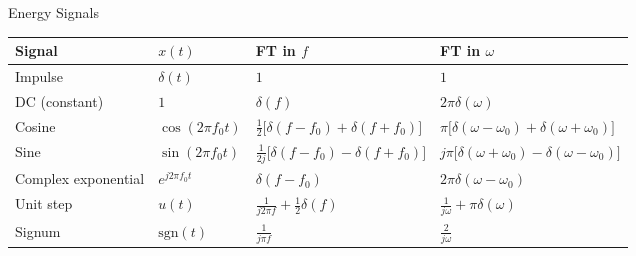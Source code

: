\documentclass[a4paper,10.5pt]{article}
\begin{document}
Energy Signals

\begin{center}
\renewcommand{\arraystretch}{1.5}
\begin{tabular}{|>{\centering\arraybackslash}m{3cm}|
                >{\centering\arraybackslash}m{3cm}|
                >{\centering\arraybackslash}m{4cm}|
                >{\centering\arraybackslash}m{4cm}|}

\hline
\textbf{Signal} & \textbf{$x(t)$} & \textbf{FT in $f$} & \textbf{FT in $\omega$} \\
\hline

Impulse & $\delta(t)$ & $1$ & $1$ \\

\hline

DC (constant) & $1$ & $\delta(f)$ & $2\pi \delta(\omega)$ \\

\hline

Cosine & $\cos(2\pi f_0 t)$ & $\tfrac{1}{2}\big[\delta(f-f_0)+\delta(f+f_0)\big]$ & $\pi\big[\delta(\omega-\omega_0)+\delta(\omega+\omega_0)\big]$ \\

\hline

Sine & $\sin(2\pi f_0 t)$ & $\tfrac{1}{2j}\big[\delta(f-f_0)-\delta(f+f_0)\big]$ & $j\pi\big[\delta(\omega+\omega_0)-\delta(\omega-\omega_0)\big]$ \\

\hline

Complex exponential & $e^{j 2\pi f_0 t}$ & $\delta(f-f_0)$ & $2\pi \delta(\omega-\omega_0)$ \\

\hline

Unit step & $u(t)$ & $\tfrac{1}{j 2\pi f} + \tfrac{1}{2}\delta(f)$ & $\tfrac{1}{j \omega} + \pi \delta(\omega)$ \\

\hline

Signum &
$\mathrm{sgn}(t)$ &
$\tfrac{1}{j\pi f}$ &
$\tfrac{2}{j\omega}$ \\

\hline

\end{tabular}
\end{center}
\end{document}
